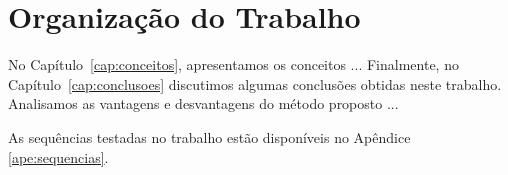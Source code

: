 \section{Organização do Trabalho}
\label{sec:organizacao_trabalho}

No Capítulo~\ref{cap:conceitos}, apresentamos os conceitos ... Finalmente, no
Capítulo~\ref{cap:conclusoes} discutimos algumas conclusões obtidas neste
trabalho. Analisamos as vantagens e desvantagens do método proposto ... 

As sequências testadas no trabalho estão disponíveis no Apêndice \ref{ape:sequencias}.
